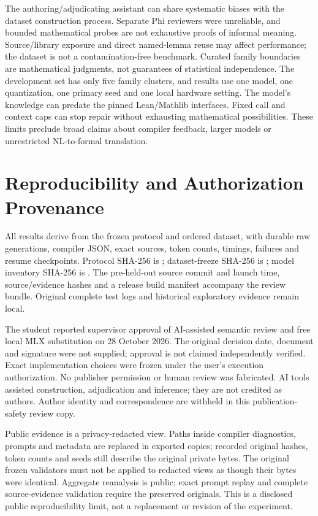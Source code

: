 \documentclass[runningheads,a4paper]{llncs}
\begin{document}
The authoring/adjudicating assistant can share systematic biases with the
dataset construction process. Separate Phi reviewers were unreliable, and
bounded mathematical probes are not exhaustive proofs of informal meaning.
Source/library exposure and direct named-lemma reuse may affect performance;
the dataset is not a contamination-free benchmark. Curated family boundaries
are mathematical judgments, not guarantees of statistical independence. The
development set has only five family clusters, and results use one model,
one quantization, one primary seed and one local hardware setting. The model's
knowledge can predate the pinned Lean/Mathlib interfaces. Fixed call and context
caps can stop repair without exhausting mathematical possibilities. These
limits preclude broad claims about compiler feedback, larger models or
unrestricted NL-to-formal translation.

\section{Reproducibility and Authorization Provenance}
All results derive from the frozen protocol and ordered dataset, with durable
raw generations, compiler JSON, exact sources, token counts, timings, failures
and resume checkpoints. Protocol SHA-256 is
; dataset-freeze SHA-256 is
; model inventory SHA-256 is
. The pre-held-out source commit and launch time,
source/evidence hashes and a release build manifest accompany the review bundle. Original complete test logs and historical exploratory evidence remain local.

The student reported supervisor approval of AI-assisted semantic review and
free local MLX substitution on 28 October 2026. The original decision date,
document and signature were not supplied; approval is not claimed independently
verified. Exact implementation choices were frozen under the user's execution
authorization. No publisher permission or human review was fabricated. AI tools
assisted construction, adjudication and inference; they are not credited as
authors. Author identity and correspondence are withheld in this publication-safety review copy.

Public evidence is a privacy-redacted view. Paths inside compiler diagnostics,
prompts and metadata are replaced in exported copies; recorded original hashes,
token counts and seeds still describe the original private bytes. The original
frozen validators must not be applied to redacted views as though their bytes
were identical. Aggregate reanalysis is public; exact prompt replay and complete
source-evidence validation require the preserved originals. This is a disclosed
public reproducibility limit, not a replacement or revision of the experiment.
\end{document}
